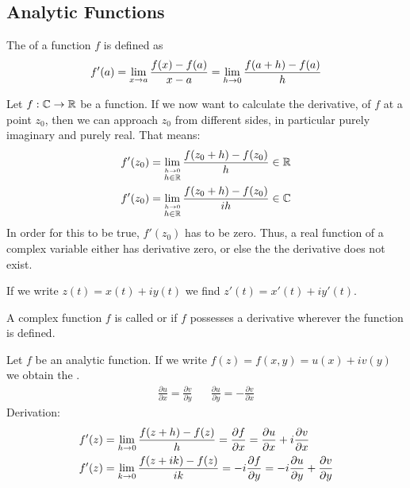 \subsection{Analytic Functions}

\begin{definition}[Derivative]
    The  of a function $f$ is defined as
    \begin{align*}
        f'(a) = \lim\limits_{x \rightarrow a} \frac{f(x) - f(a)}{x-a}
        = \lim\limits_{h \rightarrow 0} \frac{f(a+h) - f(a)}{h}
    \end{align*}
\end{definition}

\begin{theorem}
    Let $f: \mathbb{C} \rightarrow \mathbb{R}$ be a function. If we now want to calculate the derivative,
    of $f$ at a point $z_0$, then we can approach $z_0$ from different sides, in particular
    purely imaginary and purely real. That means:
    \begin{align*}
        f'(z_0) &= \lim\limits_{\stackrel{h \rightarrow 0}{h \in \mathbb{R}}} \frac{f(z_0 + h) - f(z_0)}{h}
        \in \mathbb{R}
        \\
        f'(z_0) &= \lim\limits_{\stackrel{h \rightarrow 0}{h \in \mathbb{R}}} \frac{f(z_0 + h) - f(z_0)}{i h}
        \in \mathbb{C}
    \end{align*}
    In order for this to be true, $f'(z_0)$ has to be zero. Thus, a real function of a
    complex variable either has derivative zero, or else the the derivative does
    not exist.
\end{theorem}

\begin{theorem}
    If we write $z(t) = x(t) + i y(t)$ we find $z'(t) = x'(t) + i y'(t)$.
\end{theorem}

\begin{definition}
    A complex function $f$ is called  or  if $f$
    possesses a derivative wherever the function is defined.
\end{definition}

\begin{definition}
    Let $f$ be an analytic function.
    If we write $f(z) = f(x,y) = u(x) + i v(y)$ we obtain the .
    \begin{align*}
        \frac{\partial u}{\partial x} = \frac{\partial v}{\partial y}
        \hspace{20pt}
        \frac{\partial u}{\partial y} = - \frac{\partial v}{\partial x}
    \end{align*}
    Derivation:
    \begin{align*}
        f'(z) &= \lim\limits_{h \rightarrow 0} \frac{f(z+h) - f(z)}{h} = \frac{\partial f}{\partial x} = \frac{\partial u}{\partial x} + i \frac{\partial v}{\partial x}
        \\
        f'(z) &= \lim\limits_{k \rightarrow 0} \frac{f(z+ik) - f(z)}{i k} = -i \frac{\partial f}{\partial y} = -i \frac{\partial u}{\partial y} + \frac{\partial v}{\partial y}
    \end{align*}
\end{definition}

